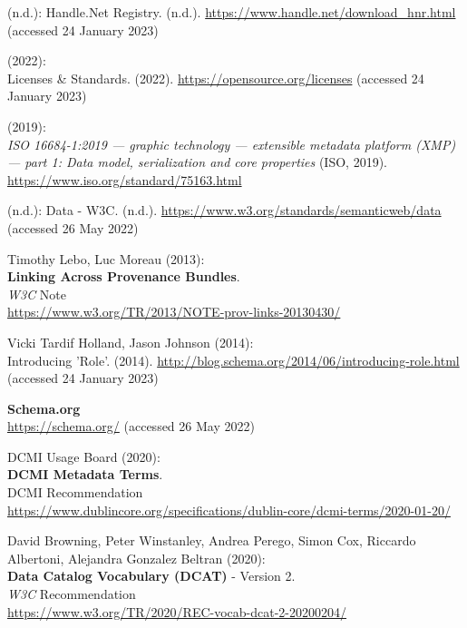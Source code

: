 \begin{thebibliography}{9}
(n.d.): Handle.{Net Registry}. (n.d.).
\url{https://www.handle.net/download_hnr.html} (accessed 24 January
2023)

(2022): \\
Licenses \& {Standards}. (2022).
\url{https://opensource.org/licenses} (accessed 24 January 2023)

(2019): \\
\emph{{ISO} 16684-1:2019 --- graphic technology --- extensible
metadata platform (XMP) --- part 1: Data model, serialization and core
properties} ({ISO}, 2019). \url{https://www.iso.org/standard/75163.html}

(n.d.): Data - {W3C}. (n.d.).
\url{https://www.w3.org/standards/semanticweb/data} (accessed 26 May
2022)

Timothy Lebo, Luc Moreau (2013): \\
\textbf{Linking {Across Provenance Bundles}}.\\
\emph{W3C} Note\\
\url{https://www.w3.org/TR/2013/NOTE-prov-links-20130430/}

Vicki Tardif Holland, Jason Johnson (2014): \\
Introducing '{Role}'.
(2014). \url{http://blog.schema.org/2014/06/introducing-role.html}
(accessed 24 January 2023)

\textbf{Schema.org}\\
\url{https://schema.org/}
(accessed 26 May 2022)

DCMI Usage Board (2020): \\
\textbf{DCMI Metadata Terms}. \\
DCMI Recommendation\\
\url{https://www.dublincore.org/specifications/dublin-core/dcmi-terms/2020-01-20/}

David Browning, Peter Winstanley, Andrea Perego, Simon Cox, Riccardo
Albertoni, Alejandra Gonzalez Beltran (2020): \\
\textbf{Data Catalog Vocabulary ({DCAT})} - Version 2.\\
\emph{W3C} Recommendation\\
\url{https://www.w3.org/TR/2020/REC-vocab-dcat-2-20200204/}


\end{thebibliography}
